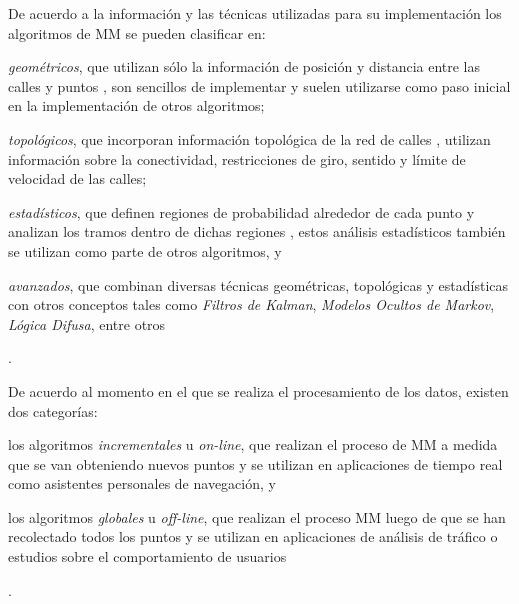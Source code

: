 De acuerdo a la información y las técnicas utilizadas para su implementación los algoritmos de MM se pueden clasificar en: \begin{enumerate*}[1)]\item \emph{geométricos}, que utilizan sólo la información de posición y distancia entre las calles y puntos \cite{white2000some}, son sencillos de implementar y suelen utilizarse como paso inicial en la implementación de otros algoritmos; \item \emph{topológicos}, que incorporan información topológica de la red de calles \cite{lou2009map,yuan2010interactive,greenfeld2002matching,quddus2003general}, utilizan información sobre la conectividad, restricciones de giro, sentido y límite de velocidad de las calles; \item \emph{estadísticos}, que definen regiones de probabilidad alrededor de cada punto y analizan los tramos dentro de dichas regiones \cite{ochieng2009map}, estos análisis estadísticos también se utilizan como parte de otros algoritmos, y \item \emph{avanzados}, que combinan diversas técnicas geométricas, topológicas y estadísticas con otros conceptos tales como \emph{Filtros de Kalman}, \emph{Modelos Ocultos de Markov}, \emph{Lógica Difusa}, entre otros \cite{thiagarajan2009vtrack,quddus2006high,thiagarajan2011accurate,fang2011enacq}\end{enumerate*}.

De acuerdo al momento en el que se realiza el procesamiento de los datos, existen dos categorías: \begin{enumerate*}[1)] \item los algoritmos \emph{incrementales} u \emph{on-line}, que realizan el proceso de MM a medida que se van obteniendo nuevos puntos \cite{thiagarajan2009vtrack,thiagarajan2011accurate,greenfeld2002matching,quddus2003general,quddus2006high} y se utilizan en aplicaciones de tiempo real como asistentes personales de navegación, y \item los algoritmos \emph{globales} u \emph{off-line}, que realizan el proceso MM luego de que se han recolectado todos los puntos \cite{lou2009map,yuan2010interactive} y se utilizan en aplicaciones de análisis de tráfico o estudios sobre el comportamiento de usuarios\end{enumerate*}.

